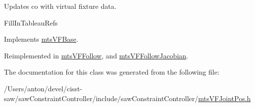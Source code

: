 Updates co with virtual fixture data. 

Fill\+In\+Tableau\+Refs 

Implements \hyperlink{classmts_v_f_base_aef5a28675f79945766a2b114c957ae6f}{mts\+V\+F\+Base}.



Reimplemented in \hyperlink{classmts_v_f_follow_a2fe8bc0fb58b00efe62b4d145e561989}{mts\+V\+F\+Follow}, and \hyperlink{classmts_v_f_follow_jacobian_a710e3cf5407eccac61f7f1d3a80d9bca}{mts\+V\+F\+Follow\+Jacobian}.



The documentation for this class was generated from the following file\+:\begin{DoxyCompactItemize}
\item 
/\+Users/anton/devel/cisst-\/saw/saw\+Constraint\+Controller/include/saw\+Constraint\+Controller/\hyperlink{mts_v_f_joint_pos_8h}{mts\+V\+F\+Joint\+Pos.\+h}\end{DoxyCompactItemize}
